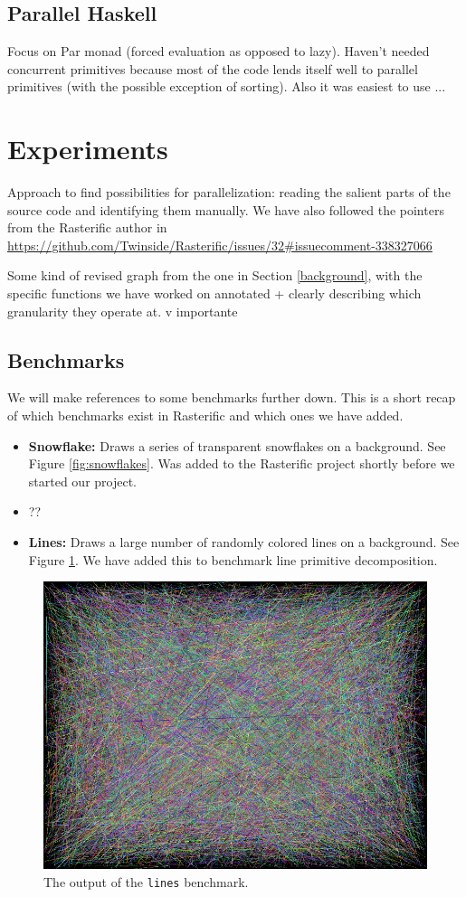\documentclass[12pt, a4paper]{article}
\begin{document}
\subsection{Parallel Haskell}

Focus on Par monad (forced evaluation as opposed to lazy). Haven't needed concurrent primitives because most of the code lends itself well to parallel primitives (with the possible exception of sorting). Also it was easiest to use ...


\section{Experiments}\label{experiments}

Approach to find possibilities for parallelization: reading the salient parts of the source code and identifying them manually. We have also followed the pointers from the Rasterific author in \url{https://github.com/Twinside/Rasterific/issues/32#issuecomment-338327066}

Some kind of revised graph from the one in Section \ref{background}, with the specific functions we have worked on annotated + clearly describing which granularity they operate at. v importante

\subsection{Benchmarks}
We will make references to some benchmarks further down. This is a short recap of which benchmarks exist in Rasterific and which ones we have added.
\begin{itemize}
\item \textbf{Snowflake:} Draws a series of transparent snowflakes on a background. See Figure \ref{fig:snowflakes}. Was added to the Rasterific project
   shortly before we started our project.
\item ??
\item \textbf{Lines:} Draws a large number of randomly colored lines on a background. See Figure \ref{fig:lines-benchmark}.
  We have added this to benchmark line primitive decomposition.
\end{itemize}
\begin{figure}[h!]
  \centering
  \includegraphics[width=.4\linewidth]{../lines}
  \caption{The output of the \texttt{lines} benchmark.}
  \label{fig:lines-benchmark}
\end{figure}
\end{document}
